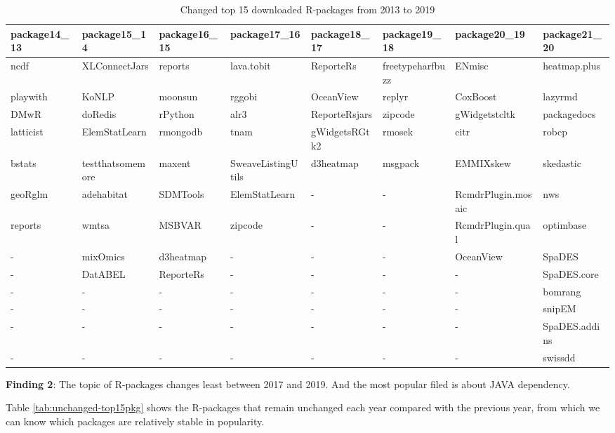 \documentclass[
]{book}
\newenvironment{discovery}[1]{%
  \begin{tcolorbox}[colback=blue!30,colframe=blue!80!black]#1}{\end{tcolorbox}}
\begin{document}
\begin{table}

\caption{\label{tab:changed-top15pkg}Changed top 15 downloaded R-packages from 2013 to 2019}
\centering
\begin{tabular}[t]{l|l|l|l|l|l|l|l}
\hline
package14\_13 & package15\_14 & package16\_15 & package17\_16 & package18\_17 & package19\_18 & package20\_19 & package21\_20\\
\hline
ncdf & XLConnectJars & reports & lava.tobit & ReporteRs & freetypeharfbuzz & ENmisc & heatmap.plus\\
\hline
playwith & KoNLP & moonsun & rggobi & OceanView & replyr & CoxBoost & lazyrmd\\
\hline
DMwR & doRedis & rPython & alr3 & ReporteRsjars & zipcode & gWidgetstcltk & packagedocs\\
\hline
latticist & ElemStatLearn & rmongodb & tnam & gWidgetsRGtk2 & rmosek & citr & robcp\\
\hline
bstats & testthatsomemore & maxent & SweaveListingUtils & d3heatmap & msgpack & EMMIXskew & skedastic\\
\hline
geoRglm & adehabitat & SDMTools & ElemStatLearn & - & - & RcmdrPlugin.mosaic & nws\\
\hline
reports & wmtsa & MSBVAR & zipcode & - & - & RcmdrPlugin.qual & optimbase\\
\hline
- & mixOmics & d3heatmap & - & - & - & OceanView & SpaDES\\
\hline
- & DatABEL & ReporteRs & - & - & - & - & SpaDES.core\\
\hline
- & - & - & - & - & - & - & bomrang\\
\hline
- & - & - & - & - & - & - & snipEM\\
\hline
- & - & - & - & - & - & - & SpaDES.addins\\
\hline
- & - & - & - & - & - & - & swissdd\\
\hline
\end{tabular}
\end{table}

\begin{discovery}
\textbf{Finding 2}: The topic of R-packages changes least between 2017
and 2019. And the most popular filed is about JAVA dependency.
\end{discovery}

Table \ref{tab:unchanged-top15pkg} shows the R-packages that remain unchanged each year compared with the previous year, from which we can know which packages are relatively stable in popularity.
\end{document}
